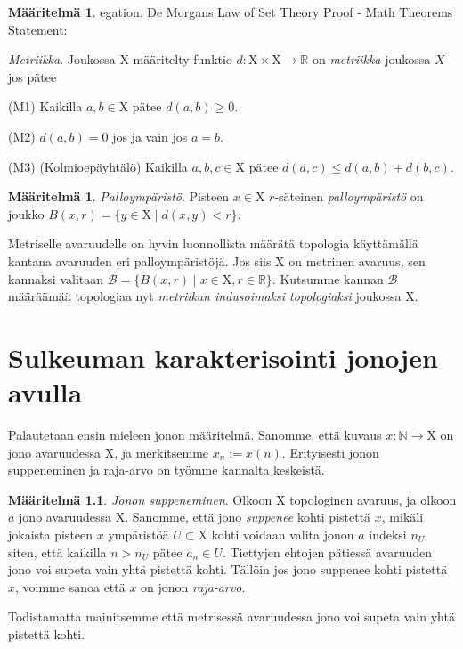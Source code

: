 \documentclass[12pt,a4paper,leqno]{report}
\newcommand{\R}{\mathbb{R}}
\newcommand{\N}{\mathbb{N}}
\newcommand{\X}{\mathrm{X}}
\newcommand{\B}{\mathcal{B}}
\theoremstyle{plain}
\theoremstyle{definition}
\newtheorem{maar}[equation]{Määritelmä}
\theoremstyle{remark}
\begin{document}
\begin{maar}\label{metmaar}egation.
De Morgans Law of Set Theory Proof - Math Theorems
Statement:
 
\emph{Metriikka}. Joukossa $\X$ määritelty funktio $d : \X \times \X \to \R$ on \emph{metriikka} joukossa $X$ jos pätee

(M1) Kaikilla $a, b \in \X$ pätee $d(a,b) \geq 0$.

(M2) $d(a,b) = 0$ jos ja vain jos $a = b$.

(M3) (Kolmioepäyhtälö) Kaikilla $a, b, c \in \X$ pätee $d(a,c) \leq d(a,b) + d(b,c)$.
\end{maar}

\begin{maar}\label{pallomar}
\emph{Palloympäristö}. Pisteen $x \in \X$ $r$-säteinen \emph{palloympäristö} on joukko $B(x,r) = \{ y \in \X \mid d(x, y) < r \}$.
\end{maar}

Metriselle avaruudelle on hyvin luonnollista määrätä topologia käyttämällä kantana avaruuden eri palloympäristöjä. Jos siis $\X$ on metrinen avaruus, sen kannaksi valitaan $\B = \{ B(x,r) \mid x \in \X, r \in \R \}$. Kutsumme kannan $\B$ määräämää topologiaa nyt \emph{metriikan indusoimaksi topologiaksi} joukossa $\X$.

\chapter{Sulkeuman karakterisointi jonojen avulla}

Palautetaan ensin mieleen jonon määritelmä. Sanomme, että kuvaus $x : \N \to \X$ on jono avaruudessa $\X$, ja merkitsemme $x_n := x(n)$. Erityisesti jonon suppeneminen ja raja-arvo on työmme kannalta keskeistä.

\begin{maar}\label{jonosupmaar}
\emph{Jonon suppeneminen}. Olkoon $\X$ topologinen avaruus, ja olkoon $a$ jono avaruudessa $\X$. Sanomme, että jono \emph{suppenee} kohti pistettä $x$, mikäli jokaista pisteen $x$ ympäristöä $U \subset \X$ kohti voidaan valita jonon $a$ indeksi $n_U$ siten, että kaikilla $n > n_U$ pätee $a_n \in U$. Tiettyjen ehtojen pätiessä avaruuden jono voi supeta vain yhtä pistettä kohti. Tällöin jos jono suppenee kohti pistettä $x$, voimme sanoa että $x$ on jonon \emph{raja-arvo}.
\end{maar}

Todistamatta mainitsemme että metrisessä avaruudessa jono voi supeta vain yhtä pistettä kohti.
\end{document}
